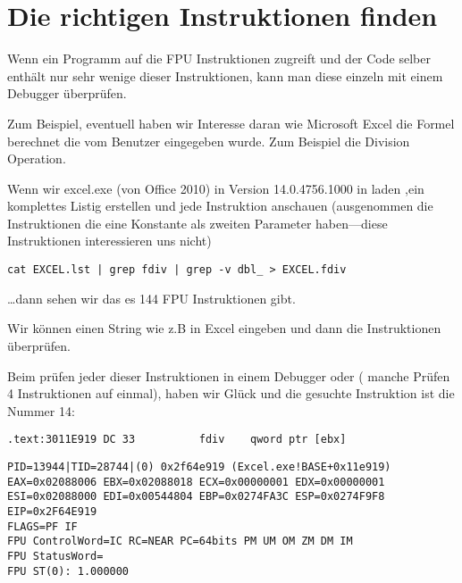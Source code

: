 \section{Die richtigen Instruktionen finden}

Wenn ein Programm auf die FPU Instruktionen zugreift und der Code selber enthält nur sehr wenige
dieser Instruktionen, kann man diese einzeln mit einem Debugger überprüfen.

\par Zum Beispiel, eventuell haben wir Interesse daran wie Microsoft Excel die Formel berechnet die vom Benutzer eingegeben wurde.
Zum Beispiel die Division Operation.

\myindex{\GrepUsage}

Wenn wir excel.exe (von Office 2010) in Version 14.0.4756.1000 in \IDA laden ,ein komplettes
Listig erstellen und jede \FDIV Instruktion anschauen (ausgenommen die Instruktionen die
eine Konstante als zweiten Parameter haben---diese Instruktionen interessieren uns nicht)

\begin{lstlisting}
cat EXCEL.lst | grep fdiv | grep -v dbl_ > EXCEL.fdiv
\end{lstlisting}

\dots dann sehen wir das es 144 FPU Instruktionen gibt.

\par Wir können einen String wie z.B  in Excel eingeben und dann die Instruktionen überprüfen.


\par Beim prüfen jeder dieser Instruktionen in einem Debugger oder \tracer
( manche Prüfen 4 Instruktionen auf einmal), haben wir Glück und die
gesuchte Instruktion ist die Nummer 14:

\begin{lstlisting}[style=customasmx86]
.text:3011E919 DC 33          fdiv    qword ptr [ebx]
\end{lstlisting}

\begin{lstlisting}
PID=13944|TID=28744|(0) 0x2f64e919 (Excel.exe!BASE+0x11e919)
EAX=0x02088006 EBX=0x02088018 ECX=0x00000001 EDX=0x00000001
ESI=0x02088000 EDI=0x00544804 EBP=0x0274FA3C ESP=0x0274F9F8
EIP=0x2F64E919
FLAGS=PF IF
FPU ControlWord=IC RC=NEAR PC=64bits PM UM OM ZM DM IM 
FPU StatusWord=
FPU ST(0): 1.000000
\end{lstlisting}


